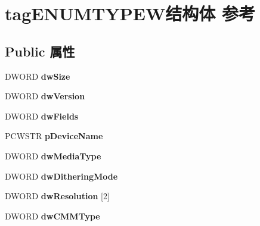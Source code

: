 \hypertarget{structtag_e_n_u_m_t_y_p_e_w}{}\section{tag\+E\+N\+U\+M\+T\+Y\+P\+E\+W结构体 参考}
\label{structtag_e_n_u_m_t_y_p_e_w}
\subsection*{Public 属性}
\begin{DoxyCompactItemize}
\item 
\mbox{\label{structtag_e_n_u_m_t_y_p_e_w_a531245cc381be28c77d9f2b399ea24ad}} 
D\+W\+O\+RD {\bfseries dw\+Size}
\item 
\mbox{\label{structtag_e_n_u_m_t_y_p_e_w_a484e4f964b21f7cbd4c062c7d75c7e30}} 
D\+W\+O\+RD {\bfseries dw\+Version}
\item 
\mbox{\label{structtag_e_n_u_m_t_y_p_e_w_a6f90518aaba7a7df4ff19b3ff3432755}} 
D\+W\+O\+RD {\bfseries dw\+Fields}
\item 
\mbox{\label{structtag_e_n_u_m_t_y_p_e_w_a7261a7b9f14a01555e596c2d469fce5d}} 
P\+C\+W\+S\+TR {\bfseries p\+Device\+Name}
\item 
\mbox{\label{structtag_e_n_u_m_t_y_p_e_w_ac90eefa294af532a0d146949b13fc22d}} 
D\+W\+O\+RD {\bfseries dw\+Media\+Type}
\item 
\mbox{\label{structtag_e_n_u_m_t_y_p_e_w_ae85710d39abd6e603d002dc0adef21c3}} 
D\+W\+O\+RD {\bfseries dw\+Dithering\+Mode}
\item 
\mbox{\label{structtag_e_n_u_m_t_y_p_e_w_aa05e778f15d6f6cf0d637304ed7f5b27}} 
D\+W\+O\+RD {\bfseries dw\+Resolution} \mbox{[}2\mbox{]}
\item 
\mbox{\label{structtag_e_n_u_m_t_y_p_e_w_a6fb2ccefdf814d371ae1ad40e06a0ee4}} 
D\+W\+O\+RD {\bfseries dw\+C\+M\+M\+Type}
\item 
\mbox{\label{structtag_e_n_u_m_t_y_p_e_w_ad733817f711b315aeaf634d86212fc77}} 

\end{DoxyCompactItemize}
